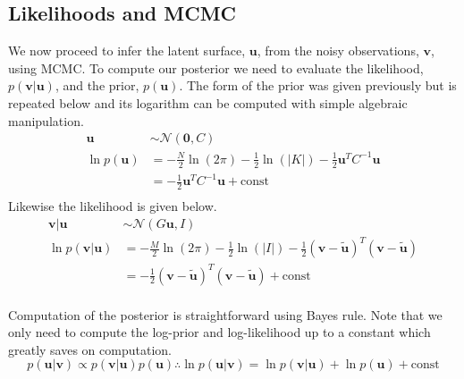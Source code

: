 \documentclass[11pt]{article}
\begin{document}
\subsection{Likelihoods and MCMC}
We now proceed to infer the latent surface, $\boldsymbol{u}$, from the noisy observations, $\boldsymbol{v}$, using MCMC. To compute our posterior we need to evaluate the likelihood, $p(\boldsymbol{v} | \boldsymbol{u})$, and the prior, $p(\boldsymbol{u})$. The form of the prior was given previously but is repeated below and its logarithm can be computed with simple algebraic manipulation.
\begin{equation}
    \begin{aligned}
        \boldsymbol{u} &\sim \mathcal{N}(\boldsymbol{0}, C) \\
        \ln p(\boldsymbol{u}) &= - \frac{N}{2}\ln(2\pi) - \frac{1}{2}\ln(|K|) - \frac{1}{2} \boldsymbol{u}^T C^{-1} \boldsymbol{u} \\
          &= - \frac{1}{2} \boldsymbol{u}^T C^{-1} \boldsymbol{u} + \text{const} \\
    \end{aligned}
\end{equation}
Likewise the likelihood is given below.
\begin{equation}
    \begin{aligned}
        \boldsymbol{v} | \boldsymbol{u} &\sim \mathcal{N}(G\boldsymbol{u}, I) \\
        \ln p(\boldsymbol{v} | \boldsymbol{u}) &= - \frac{M}{2}\ln(2\pi) - \frac{1}{2}\ln(|I|) - \frac{1}{2}(\boldsymbol{v} - \tilde{\boldsymbol{u}})^T (\boldsymbol{v} - \tilde{\boldsymbol{u}}) \\
          &= - \frac{1}{2}(\boldsymbol{v} - \tilde{\boldsymbol{u}})^T (\boldsymbol{v} - \tilde{\boldsymbol{u}}) + \text{const} \\
    \end{aligned}
\end{equation}

Computation of the posterior is straightforward using Bayes rule. Note that we only need to compute the log-prior and log-likelihood up to a constant which greatly saves on computation.
\begin{equation}
    p(\boldsymbol{u} | \boldsymbol{v}) \propto p(\boldsymbol{v} | \boldsymbol{u}) p(\boldsymbol{u}) \therefore \ln p(\boldsymbol{u} | \boldsymbol{v}) = \ln p(\boldsymbol{v} | \boldsymbol{u}) + \ln p(\boldsymbol{u}) + \text{const}
\end{equation}
\end{document}
